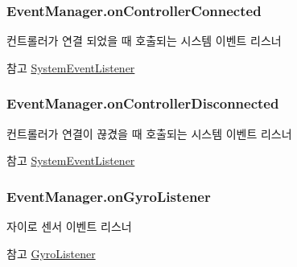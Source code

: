\subsubsection[{on\+Controller\+Connected}]{ Event\+Manager.\+on\+Controller\+Connected}\label{class_event_manager_a1982ee974be3949930955adbf2b69416}
컨트롤러가 연결 되었을 때 호출되는 시스템 이벤트 리스너 \begin{DoxySeeAlso}{참고}
\hyperlink{class_event_manager_a65e017fcb7c22959f09becc40ad3bc2d}{System\+Event\+Listener} 
\end{DoxySeeAlso}
\hypertarget{class_event_manager_a8f4ec7cfc6f0ca0d4a5872997b359861}{}
\subsubsection[{on\+Controller\+Disconnected}]{ Event\+Manager.\+on\+Controller\+Disconnected}\label{class_event_manager_a8f4ec7cfc6f0ca0d4a5872997b359861}
컨트롤러가 연결이 끊겼을 때 호출되는 시스템 이벤트 리스너 \begin{DoxySeeAlso}{참고}
\hyperlink{class_event_manager_a65e017fcb7c22959f09becc40ad3bc2d}{System\+Event\+Listener} 
\end{DoxySeeAlso}
\hypertarget{class_event_manager_a31f1da96e98896421b0026df5ce01623}{}
\subsubsection[{on\+Gyro\+Listener}]{ Event\+Manager.\+on\+Gyro\+Listener}\label{class_event_manager_a31f1da96e98896421b0026df5ce01623}
자이로 센서 이벤트 리스너 \begin{DoxySeeAlso}{참고}
\hyperlink{class_event_manager_a4ed9f5be26f2015a5cc107257f02eff8}{Gyro\+Listener} 
\end{DoxySeeAlso}
\hypertarget{class_event_manager_ab148217093b03a8cd7c962a11195c83a}{}

